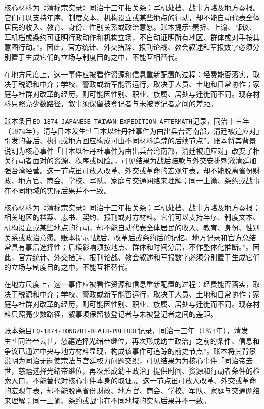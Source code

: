 核心材料为《清穆宗实录》同治十三年相关条；军机处档、战事方略及地方奏报。它们可以支持年序、制度文本、机构设立或某些地点的行动，却不能自动代表全体居民的收入、教育、身份、性别关系或政治意愿。账本提示“奏折、上谕、部议、军机档或条约可证明行政动作和机构立场，不自动证明所有地区、群体或对手按其意图行动。”。因此，官方统计、外交措辞、报刊论战、教会叙述和军报数字必须分别置于生成它们的立场与制度目的之中，不能互相替代。

在地方尺度上，这一事件应被看作资源和信息重新配置的过程：经费能否落实，取决于税源和中介；学校、警政或新军能否运行，取决于人员、土地和日常协作；家庭与社群对改革的经历，则可能因性别、职业、族属、居处与迁徙而不同。现存材料只照亮少数路径，叙事须保留被登记者与未被登记者之间的差距。

账本条目\texttt{EQ-1874-JAPANESE-TAIWAN-EXPEDITION-AFTERMATH}记录，同治十三年（1874年），清与日本发生“「日本以牡丹社事件为由出兵台湾南部，清廷被迫应对」引发的善后、执行或地方回应构成可由不同材料追踪的后续节点”。账本将其背景说明为核心事件「日本以牡丹社事件为由出兵台湾南部，清廷被迫应对」改变了相关行动者面对的资源、秩序或风险。，可见结果为战后赔款与外交安排刺激清廷加强台湾经营。这一节点虽可放入改革、外交或革命的宏观年表，却不能脱离省份财政、地方官、商会、学校、军队、家庭与交通网络来理解；同一上谕、条约或战事在不同地域的实际后果并不一致。

核心材料为《清穆宗实录》同治十三年相关条；军机处档、战事方略及地方奏报；相关地区的档案、志书、契约、报刊或对方材料。它们可以支持年序、制度文本、机构设立或某些地点的行动，却不能自动代表全体居民的收入、教育、身份、性别关系或政治意愿。账本提示“战后、改革后或条约后的记忆、地方记录和官方总结常具有事后选择性；后续影响须按地点、群体和时间分层，不作整体化推断。”。因此，官方统计、外交措辞、报刊论战、教会叙述和军报数字必须分别置于生成它们的立场与制度目的之中，不能互相替代。

在地方尺度上，这一事件应被看作资源和信息重新配置的过程：经费能否落实，取决于税源和中介；学校、警政或新军能否运行，取决于人员、土地和日常协作；家庭与社群对改革的经历，则可能因性别、职业、族属、居处与迁徙而不同。现存材料只照亮少数路径，叙事须保留被登记者与未被登记者之间的差距。

账本条目\texttt{EQ-1874-TONGZHI-DEATH-PRELUDE}记录，同治十三年（1874年），清发生“「同治帝去世，慈禧选择光绪帝继位，再次形成幼主政治」之前的条件、信息和争议已通过中央与地方材料显现，构成该事件可追踪的前史节点”。账本将其背景说明为同治无嗣使宗法与宫廷权力问题交织，可见结果为为核心事件「同治帝去世，慈禧选择光绪帝继位，再次形成幼主政治」提供时间、资源和行动者条件的检索入口，不能替代对核心事件本身的取证。。这一节点虽可放入改革、外交或革命的宏观年表，却不能脱离省份财政、地方官、商会、学校、军队、家庭与交通网络来理解；同一上谕、条约或战事在不同地域的实际后果并不一致。

